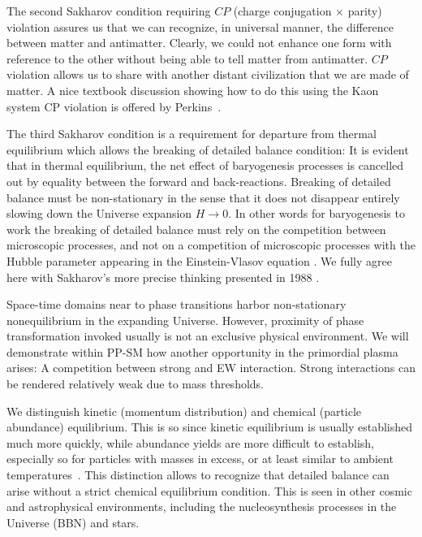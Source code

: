 The second Sakharov  condition requiring $CP$ (charge conjugation $\times$ parity)  violation assures us that we can recognize, in universal manner, the difference between matter and antimatter. Clearly, we could not enhance one form with reference to the other without being able to tell matter from antimatter. $CP$ violation allows us to share with another distant civilization that we are made of matter. A nice textbook discussion showing how to do this using the Kaon system CP violation is offered by Perkins~\cite{Perkins:1982xb}.

The third Sakharov condition  is a requirement for departure from thermal equilibrium which allows the breaking of detailed balance condition: It is evident that in thermal equilibrium, the net effect of baryogenesis processes is cancelled out by equality between the  forward and back-reactions. {\color{blue}Breaking of detailed balance must be non-stationary in the sense that it does not disappear entirely slowing down the Universe expansion $H\to 0$. In other words for baryogenesis to work the breaking of detailed balance must rely on the competition between microscopic processes, and not on a competition of microscopic processes with the Hubble parameter appearing in the Einstein-Vlasov equation . We fully agree here with Sakharov's more precise thinking presented in 1988 \cite{Sakharov:1988vdp}.} 

{\color{blue}Space-time domains near to phase transitions harbor non-stationary nonequilibrium in the expanding Universe. However, proximity of phase transformation invoked usually is not an exclusive physical environment. We will demonstrate within PP-SM how another opportunity in the primordial plasma arises: A competition between strong and EW interaction. Strong interactions can be rendered relatively weak due to mass thresholds.} 

We distinguish kinetic (momentum distribution) and chemical (particle abundance) equilibrium. This is so since kinetic equilibrium is usually established much more quickly, while abundance yields are more difficult to establish, especially so for particles with masses in excess, or at least similar to ambient temperatures~\cite{Koch:1986ud,Birrell:2014gea}. {\color{blue}This distinction allows to recognize that detailed balance can arise without a strict chemical equilibrium condition. This is seen in other cosmic and astrophysical environments, including the nucleosynthesis processes in the Universe (BBN) and stars.}  

